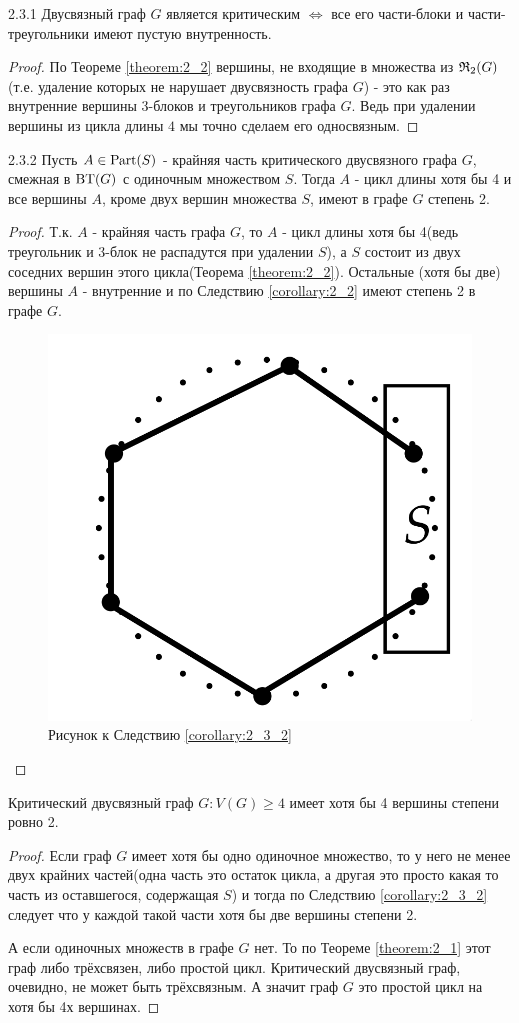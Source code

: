 \begin{customcrly}{2.3.1} \label{corollary:2_3_1}
	Двусвязный граф $G$ является критическим  $\iff$ все его части-блоки и части-треугольники имеют пустую внутренность.
\end{customcrly}

\begin{proof}
	По Теореме \ref{theorem:2_2} вершины, не входящие в множества из $\mathfrak{R}_2(G)$(т.е. удаление которых не нарушает двусвязность графа $G$) - это как раз внутренние вершины 3-блоков и треугольников графа $G$.
	Ведь при удалении вершины из цикла длины  $4$ мы точно сделаем его односвязным. 
\end{proof}

\begin{customcrly}{2.3.2} \label{corollary:2_3_2}
	Пусть $A \in \operatorname{Part}(S)$ - крайняя часть критического двусвязного графа $G$, смежная в $\operatorname{BT}(G)$ с одиночным множеством  $S$.
	Тогда  $A$ - цикл длины хотя бы 4 и все вершины  $A$, кроме двух вершин множества  $S$, имеют в графе  $G$ степень 2.
\end{customcrly}

\begin{proof}
	Т.к. $A$ - крайняя часть графа  $G$, то  $A$ - цикл длины хотя бы 4(ведь треугольник и 3-блок не распадутся при удалении $S$), а  $S$ состоит из двух соседних вершин этого цикла(Теорема \ref{theorem:2_2}).
	Остальные (хотя бы две) вершины $A$ - внутренние и по Следствию \ref{corollary:2_2} имеют степень 2 в графе  $G$.

\begin{figure}[ht]
    \centering
	\includegraphics[width=0.2\columnwidth]{figures/corollary_2_3_2.png}
    \caption{Рисунок к Следствию \ref{corollary:2_3_2}}
    \label{fig:corollary_2_3_2}
\end{figure}

\end{proof}

\begin{crly} \label{corollary:2_4}
	Критический двусвязный граф $G : V(G) \geqslant 4$ имеет хотя бы 4 вершины степени ровно 2.
\end{crly}

\begin{proof}
	Если граф $G$ имеет хотя бы одно одиночное множество, то у него не менее двух крайних частей(одна часть это остаток цикла, а другая это просто какая то часть из оставшегося, содержащая $S$) и тогда по Следствию \ref{corollary:2_3_2} следует что у каждой такой части хотя бы две вершины степени 2.

	А если одиночных множеств в графе $G$ нет. То по Теореме \ref{theorem:2_1} этот граф либо трёхсвязен, либо простой цикл.
	Критический двусвязный граф, очевидно, не может быть трёхсвязным.
	А значит граф  $G$ это простой цикл на хотя бы 4х вершинах.
\end{proof}

